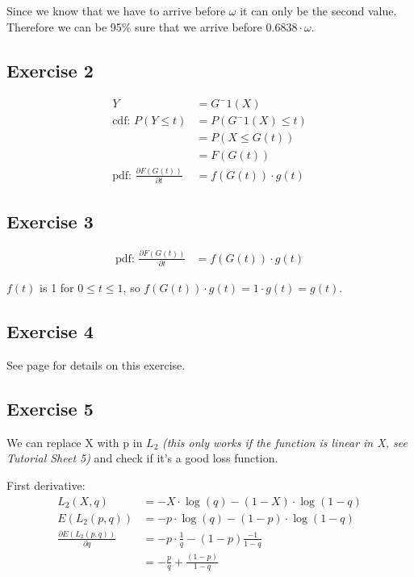 Since we know that we have to arrive before $\omega$ it can only be the second value. Therefore we can be 95\% sure that we arrive before $0.6838 \cdot \omega$.


\subsection*{Exercise 2}
\begin{align*}
Y &= G^-1(X) \\
\mbox{cdf: }   P\left(Y \leq t\right)
             &= P\left(G^-1\left(X\right) \leq t\right) \\
             &= P\left(X \leq G\left(t\right)\right) \\
             &= F\left(G\left(t\right)\right) \\
\mbox{pdf: }   \frac{\partial F\left(G\left(t\right)\right)}{\partial t}
             &= f\left(G\left(t\right)\right) \cdot g\left(t\right)
\end{align*}

\subsection*{Exercise 3}
\begin{align*}
\mbox{pdf: } \frac{\partial F\left(G\left(t\right)\right)}{\partial t} &=f\left(G\left(t\right)\right) \cdot g\left(t\right)
\end{align*}

$f(t)$ is 1 for $0 \leq t \leq 1$, so $f\left(G\left(t\right)\right) \cdot g\left(t\right) = 1 \cdot g\left(t\right) = g\left(t\right)$.

\subsection*{Exercise 4}
See page \pageref{ex4_4_solution} for details on this exercise.

\subsection*{Exercise 5}
We can replace X with p in $L_2$ \textit{(this only works if the function is linear in X, see Tutorial Sheet 5)} and check if it's a good loss function.

First derivative:
\begin{align*}
L_2\left(X,q\right) &= -X \cdot \log{\left(q\right)} - \left(1 - X\right) \cdot \log{\left(1-q\right)} \\
E\left(L_2\left(p,q\right)\right) &= -p \cdot \log{\left(q\right)} - \left(1 - p\right) \cdot \log{\left(1-q\right)} \\
\frac{\partial E\left(L_2\left(p, q\right)\right)}{\partial q} &= -p \cdot \frac{1}{q} - \left(1 - p\right) \frac{-1}{1-q} \\
&= -\frac{p}{q} + \frac{\left(1 - p\right)}{1-q}
\end{align*}

